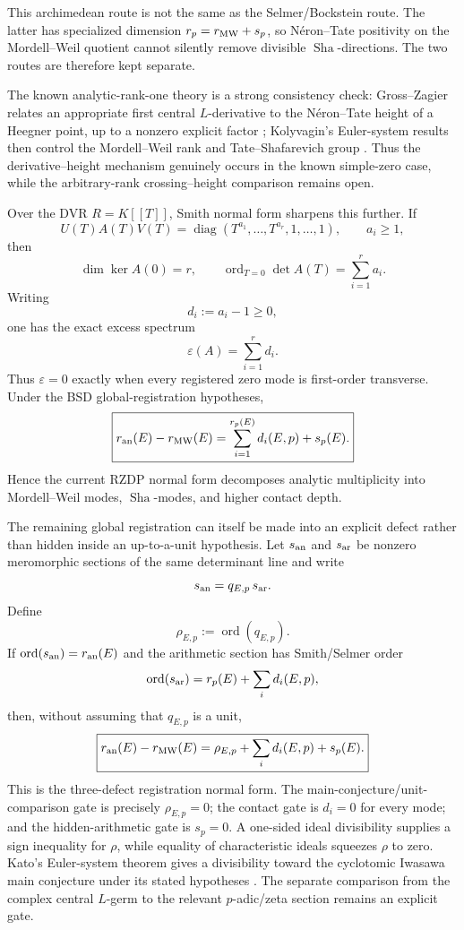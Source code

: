 \documentclass[11pt]{article}
\newcommand{\Sha}{\operatorname{Sha}}
\begin{document}
This archimedean route is not the same as the Selmer/Bockstein route. The latter has specialized dimension \(r_p=r_{\rm MW}+s_p\), so N\'eron--Tate positivity on the Mordell--Weil quotient cannot silently remove divisible \(\Sha\)-directions. The two routes are therefore kept separate.

The known analytic-rank-one theory is a strong consistency check: Gross--Zagier relates an appropriate first central \(L\)-derivative to the N\'eron--Tate height of a Heegner point, up to a nonzero explicit factor \cite{GrossZagier1986}; Kolyvagin's Euler-system results then control the Mordell--Weil rank and Tate--Shafarevich group \cite{Kolyvagin1989}. Thus the derivative--height mechanism genuinely occurs in the known simple-zero case, while the arbitrary-rank crossing--height comparison remains open.

Over the DVR \(R=K[[T]]\), Smith normal form sharpens this further. If
\[
U(T)A(T)V(T)
=
\operatorname{diag}(T^{a_1},\ldots,T^{a_r},1,\ldots,1),
\qquad a_i\ge1,
\]
then
\[
\dim\ker A(0)=r,
\qquad
\operatorname{ord}_{T=0}\det A(T)=\sum_{i=1}^r a_i.
\]
Writing
\[
d_i:=a_i-1\ge0,
\]
one has the exact excess spectrum
\[
\boxed{
\varepsilon(A)=\sum_{i=1}^r d_i.
}
\]
Thus \(\varepsilon=0\) exactly when every registered zero mode is first-order transverse. Under the BSD global-registration hypotheses,
\[
\boxed{
r_{\rm an}(E)-r_{\rm MW}(E)
=
\sum_{i=1}^{r_p(E)}d_i(E,p)+s_p(E).
}
\]
Hence the current RZDP normal form decomposes analytic multiplicity into Mordell--Weil modes, \(\Sha\)-modes, and higher contact depth.

The remaining global registration can itself be made into an explicit defect rather than hidden inside an up-to-a-unit hypothesis. Let \(s_{\rm an}\) and \(s_{\rm ar}\) be nonzero meromorphic sections of the same determinant line and write
\[
s_{\rm an}=q_{E,p}\,s_{\rm ar}.
\]
Define
\[
\rho_{E,p}:=\operatorname{ord}(q_{E,p}).
\]
If \(\operatorname{ord}(s_{\rm an})=r_{\rm an}(E)\) and the arithmetic section has Smith/Selmer order
\[
\operatorname{ord}(s_{\rm ar})=r_p(E)+\sum_i d_i(E,p),
\]
then, without assuming that \(q_{E,p}\) is a unit,
\[
\boxed{
r_{\rm an}(E)-r_{\rm MW}(E)
=
\rho_{E,p}+\sum_i d_i(E,p)+s_p(E).
}
\]
This is the three-defect registration normal form. The main-conjecture/unit-comparison gate is precisely \(\rho_{E,p}=0\); the contact gate is \(d_i=0\) for every mode; and the hidden-arithmetic gate is \(s_p=0\). A one-sided ideal divisibility supplies a sign inequality for \(\rho\), while equality of characteristic ideals squeezes \(\rho\) to zero. Kato's Euler-system theorem gives a divisibility toward the cyclotomic Iwasawa main conjecture under its stated hypotheses \cite{Kato2004}. The separate comparison from the complex central \(L\)-germ to the relevant \(p\)-adic/zeta section remains an explicit gate.
\end{document}
